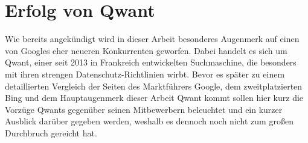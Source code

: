 \section{Erfolg von Qwant}\label{sec:qwant-erfolg}

Wie bereits angekündigt wird in dieser Arbeit besonderes Augenmerk auf einen von Googles eher neueren Konkurrenten
geworfen.
Dabei handelt es sich um Qwant, einer seit 2013 in Frankreich entwickelten Suchmaschine, die besonders mit ihren
strengen Datenschutz-Richtlinien wirbt.
Bevor es später zu einem detaillierten Vergleich der Seiten des Marktführers Google, dem zweitplatzierten Bing und dem
Hauptaugenmerk dieser Arbeit Qwant kommt sollen hier kurz die Vorzüge Qwants gegenüber seinen Mitbewerbern beleuchtet
und ein kurzer Ausblick darüber gegeben werden, weshalb es dennoch noch nicht zum großen Durchbruch gereicht hat.

